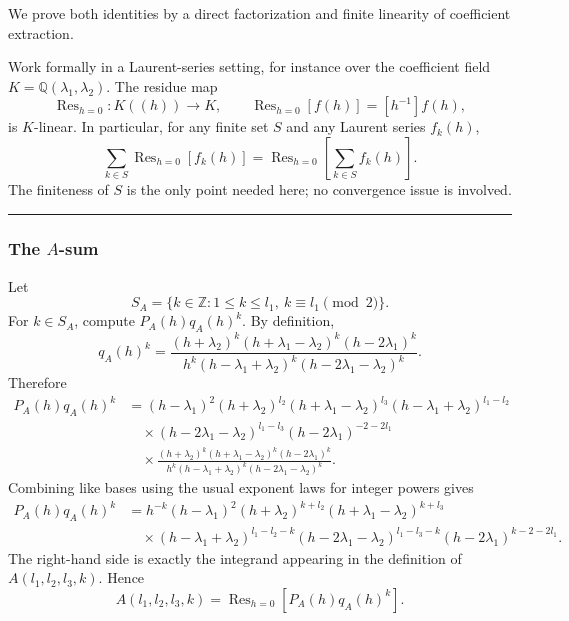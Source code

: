 We prove both identities by a direct factorization and finite linearity of coefficient extraction.

Work formally in a Laurent-series setting, for instance over the coefficient field \(K=\mathbb{Q}(\lambda_1,\lambda_2)\). The residue map
\[
\operatorname{Res}_{h=0}:K((h))\to K,\qquad \operatorname{Res}_{h=0}[f(h)]=[h^{-1}]f(h),
\]
is \(K\)-linear. In particular, for any finite set \(S\) and any Laurent series \(f_k(h)\),
\[
\sum_{k\in S}\operatorname{Res}_{h=0}[f_k(h)]
=
\operatorname{Res}_{h=0}\!\left[\sum_{k\in S} f_k(h)\right].
\]
The finiteness of \(S\) is the only point needed here; no convergence issue is involved.

\medskip\noindent\rule{\linewidth}{0.4pt}

\subsubsection*{The \(A\)-sum}

Let
\[
S_A=\{k\in\mathbb{Z}:1\le k\le l_1,\ k\equiv l_1\pmod 2\}.
\]
For \(k\in S_A\), compute \(P_A(h)q_A(h)^k\). By definition,
\[
q_A(h)^k
=
\frac{(h+\lambda_2)^k(h+\lambda_1-\lambda_2)^k(h-2\lambda_1)^k}
{h^k(h-\lambda_1+\lambda_2)^k(h-2\lambda_1-\lambda_2)^k}.
\]
Therefore
\begin{align*}
P_A(h)q_A(h)^k
&=
(h-\lambda_1)^2
(h+\lambda_2)^{l_2}
(h+\lambda_1-\lambda_2)^{l_3}
(h-\lambda_1+\lambda_2)^{l_1-l_2} \\
&\quad\times
(h-2\lambda_1-\lambda_2)^{l_1-l_3}
(h-2\lambda_1)^{-2-2l_1} \\
&\quad\times
\frac{(h+\lambda_2)^k(h+\lambda_1-\lambda_2)^k(h-2\lambda_1)^k}
{h^k(h-\lambda_1+\lambda_2)^k(h-2\lambda_1-\lambda_2)^k}.
\end{align*}
Combining like bases using the usual exponent laws for integer powers gives
\begin{align*}
P_A(h)q_A(h)^k
&=
h^{-k}(h-\lambda_1)^2
(h+\lambda_2)^{k+l_2}
(h+\lambda_1-\lambda_2)^{k+l_3} \\
&\quad\times
(h-\lambda_1+\lambda_2)^{l_1-l_2-k}
(h-2\lambda_1-\lambda_2)^{l_1-l_3-k}
(h-2\lambda_1)^{k-2-2l_1}.
\end{align*}
The right-hand side is exactly the integrand appearing in the definition of \(A(l_1,l_2,l_3,k)\). Hence
\[
A(l_1,l_2,l_3,k)
=
\operatorname{Res}_{h=0}\!\left[P_A(h)q_A(h)^k\right].
\]


